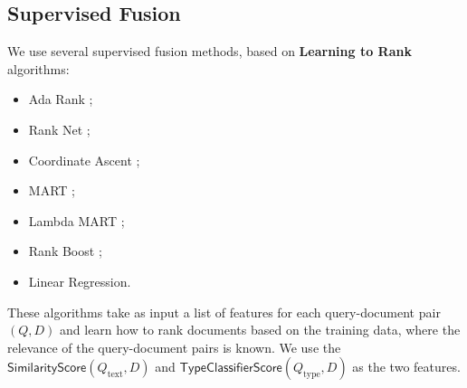 \subsection{Supervised Fusion}
We use several supervised fusion methods, based on \textbf{Learning to Rank} algorithms:
\begin{itemize}
 \item {Ada Rank} \cite{adaRank};
 \item {Rank Net} \cite{rankNet};
 \item {Coordinate Ascent} \cite{coordAscent};
 \item {MART} \cite{mart};
 \item {Lambda MART} \cite{lambda-mart};
 \item {Rank Boost} \cite{rankBoost};
  \item {Linear Regression}.
\end{itemize}

These algorithms take as input a list of features for each query-document pair $(Q,D)$ and learn how to rank documents based on the
training data, where the relevance of the query-document pairs is known.
We use the $\textsf{SimilarityScore}(Q_{\text{text}},D)$ and $\textsf{TypeClassifierScore}(Q_{\text{type}}, D)$ as the two features.


